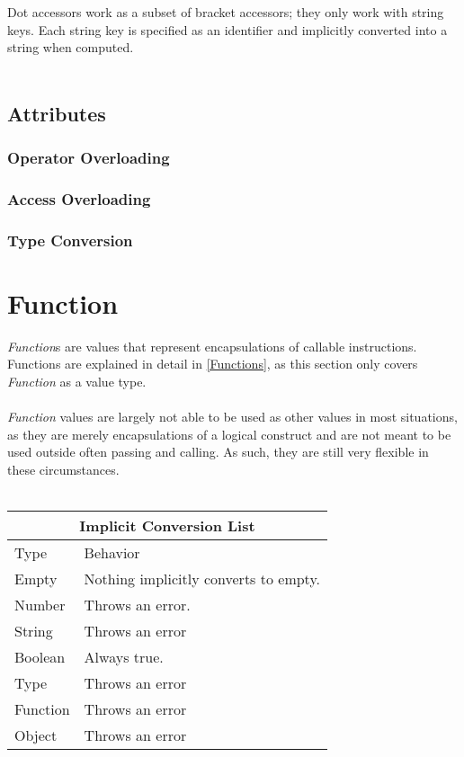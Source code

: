 \documentclass[12pt,letterpaper]{report}
\begin{document}
Dot accessors work as a subset of bracket accessors; they only work with string keys. 
Each string key is specified as an identifier and implicitly converted into a string when computed.
\\\\



\subsection{Attributes}\label{Attributes}



\subsubsection{Operator Overloading}\label{Operator Overloading}
\subsubsection{Access Overloading}\label{Access Overloading}
\subsubsection{Type Conversion}\label{Type Conversion}



\section{Function}\label{Function}

\textit{Function}s are values that represent encapsulations of callable instructions. Functions are
explained in detail in \autoref{Functions}, as this section only covers \textit{Function} as 
a value type.
\\\\
\textit{Function} values are largely not able to be used as other values in most situations, as 
they are merely encapsulations of a logical construct and are not meant to be used outside often
passing and calling. As such, they are still very flexible in these circumstances.
\\\\
{
\centering
\begin{tabular}{ |p{2.5cm}||p{10cm}|  }
  \hline
  \multicolumn{2}{|c|}{Implicit Conversion List} \\
  \hline
  Type & Behavior\\
  \hline
  Empty & Nothing implicitly converts to empty.\\
  Number  & Throws an error. \\
  String & Throws an error\\
  Boolean & Always true. \\
  Type & Throws an error\\
  Function & Throws an error\\
  Object & Throws an error\\
 \hline
\end{tabular}
}
\end{document}
